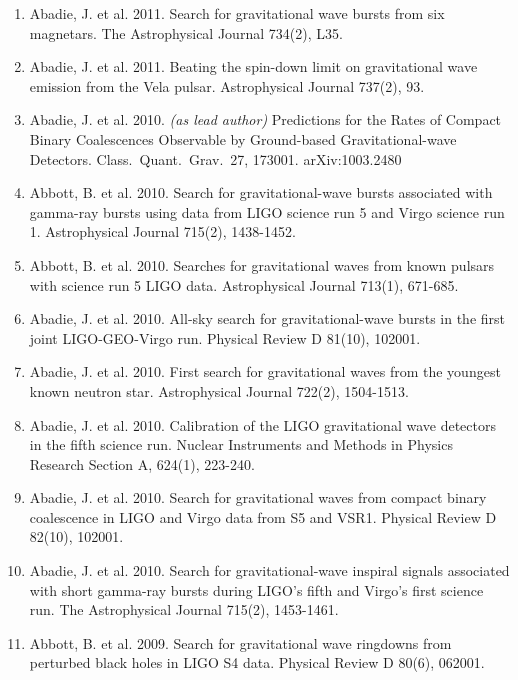\documentclass[margin,line]{res}
\begin{document}
\begin{resume}
\begin{enumerate}
\item Abadie, J. et al. 2011. Search for gravitational wave bursts from six magnetars. The Astrophysical Journal 734(2), L35.

\item Abadie, J. et al. 2011. Beating the spin-down limit on gravitational wave emission from the Vela pulsar. Astrophysical Journal 737(2),  93. 

\item  Abadie, J. et al. 2010.  {\it (as lead author)}  Predictions for the Rates of Compact Binary Coalescences Observable by Ground-based Gravitational-wave Detectors.  Class.~Quant.~Grav.~27, 173001. arXiv:1003.2480  

\item Abbott, B. et al. 2010. Search for gravitational-wave bursts associated with gamma-ray bursts using data from LIGO science run 5 and Virgo science run 1. Astrophysical Journal 715(2), 1438-1452. 

\item Abbott, B. et al. 2010. Searches for gravitational waves from known pulsars with science run 5 LIGO data. Astrophysical Journal 713(1), 671-685. 

\item Abadie, J. et al. 2010. All-sky search for gravitational-wave bursts in the first joint LIGO-GEO-Virgo run. Physical Review D 81(10), 102001. 

\item Abadie, J. et al. 2010. First search for gravitational waves from the youngest known neutron star. Astrophysical Journal 722(2), 1504-1513. 

\item Abadie, J. et al. 2010. Calibration of the LIGO gravitational wave detectors in the fifth science run. Nuclear Instruments and Methods in Physics Research Section A, 624(1), 223-240. 

\item Abadie, J. et al. 2010. Search for gravitational waves from compact binary coalescence in LIGO and Virgo data from S5 and VSR1. Physical Review D 82(10), 102001. 

\item Abadie, J. et al. 2010. Search for gravitational-wave inspiral signals associated with short gamma-ray bursts during LIGO's fifth and Virgo's first science run. The Astrophysical Journal 715(2), 1453-1461. 

\item Abbott, B. et al. 2009. Search for gravitational wave ringdowns from perturbed black holes in LIGO S4 data. Physical Review D 80(6), 062001. 


\end{enumerate}
\end{resume}
\end{document}
